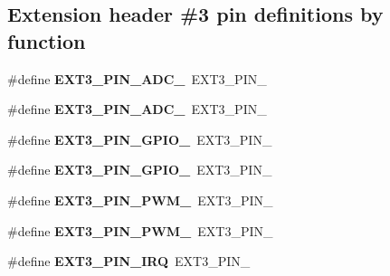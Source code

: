 \subsection*{Extension header \#3 pin definitions by function}
\begin{DoxyCompactItemize}
\item 
\hypertarget{group__saml21__xplained__pro__features__group_gab613ff1e93459a7159a42fa50a352281}{}\#define {\bfseries E\+X\+T3\+\_\+\+P\+I\+N\+\_\+\+A\+D\+C\+\_}~E\+X\+T3\+\_\+\+P\+I\+N\+\_\label{group__saml21__xplained__pro__features__group_gab613ff1e93459a7159a42fa50a352281}

\item 
\hypertarget{group__saml21__xplained__pro__features__group_ga37d0af5deaabdad4c7e2be4a2fad81a4}{}\#define {\bfseries E\+X\+T3\+\_\+\+P\+I\+N\+\_\+\+A\+D\+C\+\_}~E\+X\+T3\+\_\+\+P\+I\+N\+\_\label{group__saml21__xplained__pro__features__group_ga37d0af5deaabdad4c7e2be4a2fad81a4}

\item 
\hypertarget{group__saml21__xplained__pro__features__group_ga0fcf49640ad0c8cdb543b616f5202c11}{}\#define {\bfseries E\+X\+T3\+\_\+\+P\+I\+N\+\_\+\+G\+P\+I\+O\+\_}~E\+X\+T3\+\_\+\+P\+I\+N\+\_\label{group__saml21__xplained__pro__features__group_ga0fcf49640ad0c8cdb543b616f5202c11}

\item 
\hypertarget{group__saml21__xplained__pro__features__group_gaf1491d9740447373c693ce7fe36fb8c1}{}\#define {\bfseries E\+X\+T3\+\_\+\+P\+I\+N\+\_\+\+G\+P\+I\+O\+\_}~E\+X\+T3\+\_\+\+P\+I\+N\+\_\label{group__saml21__xplained__pro__features__group_gaf1491d9740447373c693ce7fe36fb8c1}

\item 
\hypertarget{group__saml21__xplained__pro__features__group_ga38bee8d1c9027e2005cce205817e230d}{}\#define {\bfseries E\+X\+T3\+\_\+\+P\+I\+N\+\_\+\+P\+W\+M\+\_}~E\+X\+T3\+\_\+\+P\+I\+N\+\_\label{group__saml21__xplained__pro__features__group_ga38bee8d1c9027e2005cce205817e230d}

\item 
\hypertarget{group__saml21__xplained__pro__features__group_ga33687da9c2c7a58f75d902ca9333ab17}{}\#define {\bfseries E\+X\+T3\+\_\+\+P\+I\+N\+\_\+\+P\+W\+M\+\_}~E\+X\+T3\+\_\+\+P\+I\+N\+\_\label{group__saml21__xplained__pro__features__group_ga33687da9c2c7a58f75d902ca9333ab17}

\item 
\hypertarget{group__saml21__xplained__pro__features__group_gae5a41442bb3e9715c25f4cdc2d74f75a}{}\#define {\bfseries E\+X\+T3\+\_\+\+P\+I\+N\+\_\+\+I\+R\+Q}~E\+X\+T3\+\_\+\+P\+I\+N\+\_\label{group__saml21__xplained__pro__features__group_gae5a41442bb3e9715c25f4cdc2d74f75a}


\end{DoxyCompactItemize}
